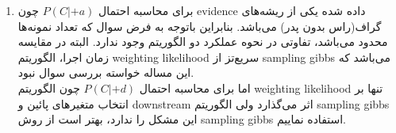 \begin{enumerate} [label=(\alph*)]
	\item
	
	برای محاسبه احتمال $P(C| + a)$ چون evidence داده شده یکی از ریشه‌های گراف(راس بدون پدر) می‌باشد. بنابراین باتوجه به فرض سوال که تعداد نمونه‌ها محدود می‌باشد، تفاوتی در نحوه عملکرد دو الگوریتم وجود ندارد. البته در مقایسه زمان اجرا،‌ الگوریتم weighting likelihood سریع‌تز از sampling gibbs می‌باشد که این مساله خواسته بررسی سوال نبود.\\
	اما برای محاسبه احتمال $P(C| + d)$ چون الگوریتم weighting likelihood تنها بر انتخاب متغیرهای پائین و downstream اثر می‌گذارد ولی الگوریتم sampling gibbs این مشکل را ندارد،‌ بهتر است از روش sampling gibbs استفاده نماییم.
	
\end{enumerate}